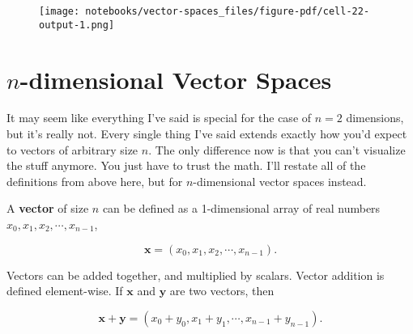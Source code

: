 \documentclass[
  letterpaper,
  DIV=11,
  numbers=noendperiod]{scrreprt}
\newenvironment{Shaded}{\begin{snugshade}}{\end{snugshade}}
\newcommand{\DecValTok}[1]{\textcolor[rgb]{0.68,0.00,0.00}{#1}}
\newcommand{\NormalTok}[1]{\textcolor[rgb]{0.00,0.23,0.31}{#1}}
\newcommand{\OperatorTok}[1]{\textcolor[rgb]{0.37,0.37,0.37}{#1}}
\newcommand{\SpecialCharTok}[1]{\textcolor[rgb]{0.37,0.37,0.37}{#1}}
\newcommand{\StringTok}[1]{\textcolor[rgb]{0.13,0.47,0.30}{#1}}
\begin{document}
\begin{Shaded}
\end{Shaded}

\begin{figure}[H]

{\centering \texttt{[image: notebooks/vector-spaces\_files/figure-pdf/cell-22-output-1.png]}

}

\end{figure}

\hypertarget{n-dimensional-vector-spaces}{%
\section{\texorpdfstring{\(n\)-dimensional Vector
Spaces}{n-dimensional Vector Spaces}}\label{n-dimensional-vector-spaces}}

It may seem like everything I've said is special for the case of \(n=2\)
dimensions, but it's really not. Every single thing I've said extends
exactly how you'd expect to vectors of arbitrary size \(n\). The only
difference now is that you can't visualize the stuff anymore. You just
have to trust the math. I'll restate all of the definitions from above
here, but for \(n\)-dimensional vector spaces instead.

A \textbf{vector} of size \(n\) can be defined as a 1-dimensional array
of real numbers \(x_0,x_1,x_2,\cdots,x_{n-1}\),

\[\mathbf{x} = (x_0,x_1,x_2,\cdots,x_{n-1}).\]

Vectors can be added together, and multiplied by scalars. Vector
addition is defined element-wise. If \(\mathbf{x}\) and \(\mathbf{y}\)
are two vectors, then

\[\mathbf{x} + \mathbf{y} = (x_0+y_0, x_1+y_1, \cdots, x_{n-1}+y_{n-1}).\]
\end{document}
